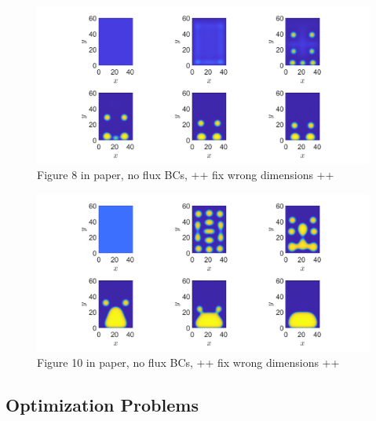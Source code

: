 \documentclass[11pt, a4paper]{article}
\theoremstyle{definition}
\begin{document}
\begin{figure}[h]
	\centering
	\includegraphics[scale=0.2]{FW0072.png}
	\caption{Figure 8 in paper, no flux BCs, ++ fix wrong dimensions ++} 
	\label{F5b}
\end{figure}
\begin{figure}[h]
	\centering
	\includegraphics[scale=0.35]{FW02.png}
	\caption{Figure 10 in paper, no flux BCs, ++ fix wrong dimensions ++} 
	\label{F7b}
\end{figure}

\subsection{Optimization Problems}
\end{document}
